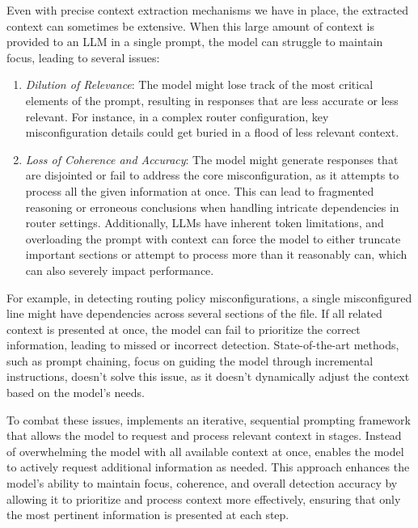 Even with precise context extraction mechanisms we have in place, the extracted context can sometimes be extensive. When this large amount of context is provided to an LLM in a single prompt, the model can struggle to maintain focus, leading to several issues:
\begin{enumerate}
    \item \textit{Dilution of Relevance}: The model might lose track of the most critical elements of the prompt, resulting in responses that are less accurate or less relevant. For instance, in a complex router configuration, key misconfiguration details could get buried in a flood of less relevant context.
    \item \textit{Loss of Coherence and Accuracy}: The model might generate responses that are disjointed or fail to address the core misconfiguration, as it attempts to process all the given information at once. This can lead to fragmented reasoning or erroneous conclusions when handling intricate dependencies in router settings. Additionally, LLMs have inherent token limitations, and overloading the prompt with context can force the model to either truncate important sections or attempt to process more than it reasonably can, which can also severely impact performance.
\end{enumerate}

For example, in detecting routing policy misconfigurations, a single misconfigured line might have dependencies across several sections of the file. If all related context is presented at once, the model can fail to prioritize the correct information, leading to missed or incorrect detection. State-of-the-art methods, such as prompt chaining, focus on guiding the model through incremental instructions, doesn't solve this issue, as it doesn't dynamically adjust the context based on the model's needs.


To combat these issues, \sysname{} implements an iterative, sequential prompting framework that allows the model to request and process relevant context in stages. Instead of overwhelming the model with all available context at once, \sysname{} enables the model to actively request additional information as needed. This approach enhances the model’s ability to maintain focus, coherence, and overall detection accuracy by allowing it to prioritize and process context more effectively, ensuring that only the most pertinent information is presented at each step.

